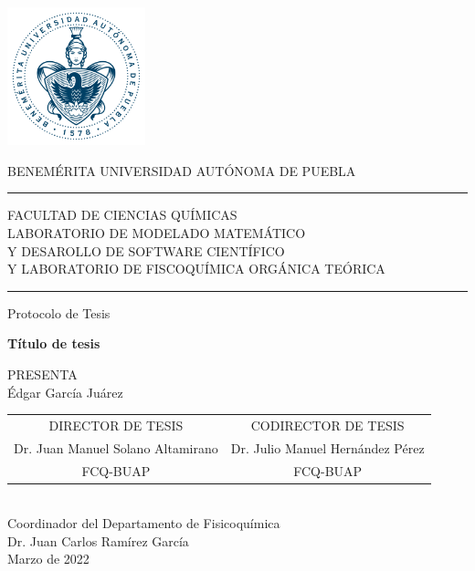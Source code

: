 \documentclass[12pt]{article}
\newcommand\vtab[1][0.5cm]{\vspace*{#1}}
\begin{document}
\pagestyle{empty} 
\begin{center}
\includegraphics[width=4cm]{Images/buap2014.png}

BENEMÉRITA UNIVERSIDAD AUTÓNOMA DE PUEBLA\\
\rule{150mm}{0.1mm}
\begin{small}
FACULTAD DE CIENCIAS QUÍMICAS\\
LABORATORIO DE MODELADO MATEMÁTICO\\
Y DESAROLLO DE SOFTWARE CIENTÍFICO\\
Y LABORATORIO DE FISCOQUÍMICA ORGÁNICA TEÓRICA\\
\end{small}
\rule{150mm}{0.1mm}

\vtab[.1cm]
\Large{Protocolo de Tesis}\\
\vtab[0.2cm]

\large{\textbf{Título de tesis}}\\
\vtab[0.2cm]

PRESENTA \\
Édgar García Juárez \\
\vtab[0.6cm]
\begin{tabular}{cc}
DIRECTOR DE TESIS & CODIRECTOR DE TESIS \\ 
Dr. Juan Manuel Solano Altamirano & Dr. Julio Manuel Hernández Pérez \\ 
FCQ-BUAP & FCQ-BUAP \\ 
\end{tabular} 
\vtab[1cm] \\
\large{Coordinador del Departamento de Fisicoquímica\\
Dr. Juan Carlos Ramírez García}\\
\vtab[0.4cm]
Marzo de 2022 \\
\end{center}

\newpage

\pagestyle{plain} 
\end{document}
